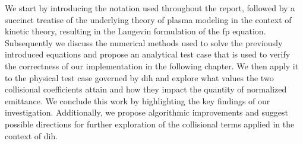 We start by introducing the notation used throughout the report, followed by a succinct treatise of the
underlying theory of plasma modeling in the context of kinetic theory, resulting in the Langevin formulation of
the \gls{fp} equation.
Subsequently we discuss the numerical methods used to solve the previously introduced equations and
propose an analytical test case that is used to verify the correctness of our implementation in the following chapter.
We then apply it to the physical test case governed by \gls{dih} and explore what
values the two collisional coefficients attain and how they impact the quantity of normalized emittance.
We conclude this work by highlighting the key findings of our investigation.
Additionally, we propose algorithmic improvements and suggest possible directions for further exploration
of the collisional terms applied in the context of \gls{dih}.
